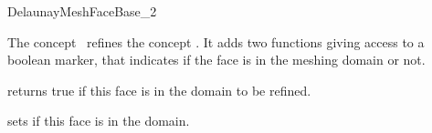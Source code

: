 \begin{ccRefConcept}{DelaunayMeshFaceBase_2}

\ccDefinition

The concept \ccRefName\ refines the concept
  . It adds two functions giving access
  to a boolean marker, that indicates if the face is in the
  meshing domain or not.

\ccRefines
{}


\ccAccessFunctions

{ returns true if this face is in the domain to be refined.}

{ sets if this face is in the domain. }

\ccHasModels
{}

\end{ccRefConcept}

